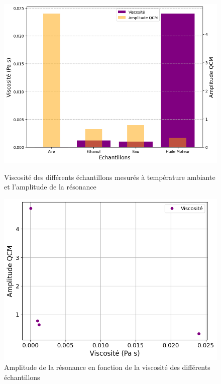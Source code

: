 \begin{figure}[H]
    \centering
    \begin{minipage}{0.48\textwidth}
        \centering
        \includegraphics[width=\textwidth]{assets/figures/viscositeAmplitudeBar.png}
        \caption{Viscosité des différents échantillons mesurés à température ambiante et l'amplitude de la résonance}
        \label{fig:Viscosité des différents échantillons}
    \end{minipage}\hfill
    \begin{minipage}{0.48\textwidth}
        \centering
        \includegraphics[width=\textwidth]{assets/figures/AmpitudeVSViscosite.png}
        \caption{Amplitude de la résonance en fonction de la viscosité des différents échantillons}
        \label{fig:Amplitude VS Viscosité}
    \end{minipage}
\end{figure}

